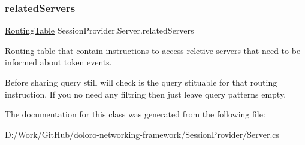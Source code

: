 \subsubsection{\texorpdfstring{related\+Servers}{relatedServers}}
{\footnotesize\ttfamily \mbox{\hyperlink{class_pipes_provider_1_1_networking_1_1_routing_1_1_routing_table}{Routing\+Table}} Session\+Provider.\+Server.\+related\+Servers\hspace{0.3cm}{\ttfamily [static]}}



Routing table that contain instructions to access reletive servers that need to be informed about token events. 

Before sharing query still will check is the query stituable for that routing instruction. If you no need any filtring then just leave query patterns empty. 

The documentation for this class was generated from the following file\+:\begin{DoxyCompactItemize}
\item 
D\+:/\+Work/\+Git\+Hub/doloro-\/networking-\/framework/\+Session\+Provider/Server.\+cs\end{DoxyCompactItemize}
